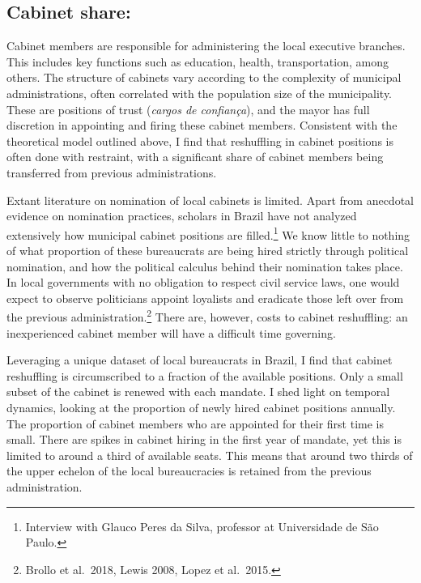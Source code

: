 \documentclass[12pt,]{article}
\let\rmarkdownfootnote\footnote%
\def\footnote{\protect\rmarkdownfootnote}
\begin{document}
\hypertarget{cabinet-share}{%
\subsection{Cabinet share:}\label{cabinet-share}}

Cabinet members are responsible for administering the local executive
branches. This includes key functions such as education, health,
transportation, among others. The structure of cabinets vary according
to the complexity of municipal administrations, often correlated with
the population size of the municipality. These are positions of trust
(\textit{cargos de confiança}), and the mayor has full discretion in
appointing and firing these cabinet members. Consistent with the
theoretical model outlined above, I find that reshuffling in cabinet
positions is often done with restraint, with a significant share of
cabinet members being transferred from previous administrations.

Extant literature on nomination of local cabinets is limited. Apart from
anecdotal evidence on nomination practices, scholars in Brazil have not
analyzed extensively how municipal cabinet positions are
filled.\footnote{Interview with Glauco Peres da Silva, professor at
  Universidade de São Paulo.} We know little to nothing of what
proportion of these bureaucrats are being hired strictly through
political nomination, and how the political calculus behind their
nomination takes place. In local governments with no obligation to
respect civil service laws, one would expect to observe politicians
appoint loyalists and eradicate those left over from the previous
administration.\footnote{Brollo et al.~2018, Lewis 2008, Lopez et
  al.~2015.} There are, however, costs to cabinet reshuffling: an
inexperienced cabinet member will have a difficult time governing.

Leveraging a unique dataset of local bureaucrats in Brazil, I find that
cabinet reshuffling is circumscribed to a fraction of the available
positions. Only a small subset of the cabinet is renewed with each
mandate. I shed light on temporal dynamics, looking at the proportion of
newly hired cabinet positions annually. The proportion of cabinet
members who are appointed for their first time is small. There are
spikes in cabinet hiring in the first year of mandate, yet this is
limited to around a third of available seats. This means that around two
thirds of the upper echelon of the local bureaucracies is retained from
the previous administration.
\end{document}
